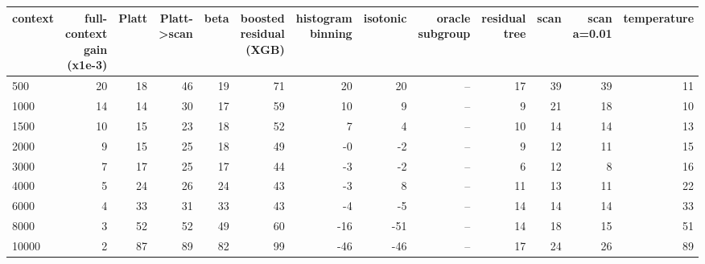 \begin{tabular}{lrrrrrrrrrrrr}
\toprule
context & full-context gain (x1e-3) & Platt & Platt->scan & beta & boosted residual (XGB) & histogram binning & isotonic & oracle subgroup & residual tree & scan & scan a=0.01 & temperature \\
\midrule
500 & 20 & 18 & 46 & 19 & 71 & 20 & 20 & -- & 17 & 39 & 39 & 11 \\
1000 & 14 & 14 & 30 & 17 & 59 & 10 & 9 & -- & 9 & 21 & 18 & 10 \\
1500 & 10 & 15 & 23 & 18 & 52 & 7 & 4 & -- & 10 & 14 & 14 & 13 \\
2000 & 9 & 15 & 25 & 18 & 49 & -0 & -2 & -- & 9 & 12 & 11 & 15 \\
3000 & 7 & 17 & 25 & 17 & 44 & -3 & -2 & -- & 6 & 12 & 8 & 16 \\
4000 & 5 & 24 & 26 & 24 & 43 & -3 & 8 & -- & 11 & 13 & 11 & 22 \\
6000 & 4 & 33 & 31 & 33 & 43 & -4 & -5 & -- & 14 & 14 & 14 & 33 \\
8000 & 3 & 52 & 52 & 49 & 60 & -16 & -51 & -- & 14 & 18 & 15 & 51 \\
10000 & 2 & 87 & 89 & 82 & 99 & -46 & -46 & -- & 17 & 24 & 26 & 89 \\
\bottomrule
\end{tabular}
